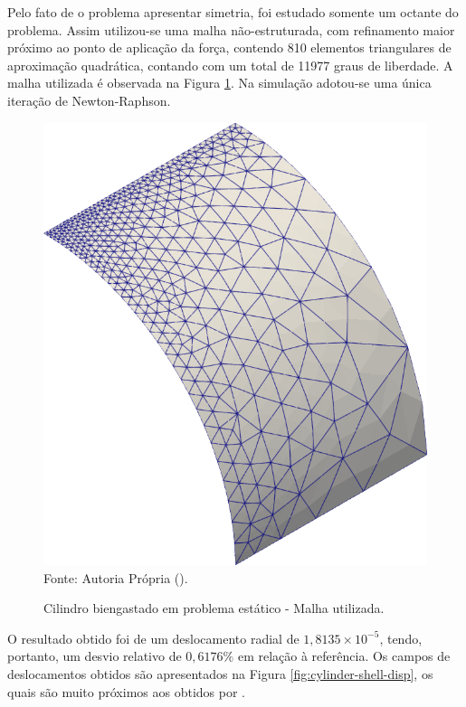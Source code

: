 Pelo fato de o problema apresentar simetria, foi estudado somente um octante do problema. Assim utilizou-se uma malha não-estruturada, com refinamento maior próximo ao ponto de aplicação da força, contendo 810 elementos triangulares de aproximação quadrática, contando com um total de 11977 graus de liberdade. A malha utilizada é observada na Figura \ref{fig:cylinder-shell-mesh}. Na simulação adotou-se uma única iteração de Newton-Raphson.

\begin{figure}[h!]
    \centering
    \caption{Cilindro biengastado em problema estático - Malha utilizada.}
    \includegraphics[width=0.3\linewidth]{Figuras/cylinder-shell/mesh1.png}
    \\Fonte: Autoria Própria (\the\year).
    \label{fig:cylinder-shell-mesh}
\end{figure}

O resultado obtido foi de um deslocamento radial de $1,8135\times10^{-5}$, tendo, portanto, um desvio relativo de $0,6176\%$ em relação à referência. Os campos de deslocamentos obtidos são apresentados na Figura \ref{fig:cylinder-shell-disp}, os quais são muito próximos aos obtidos por .

